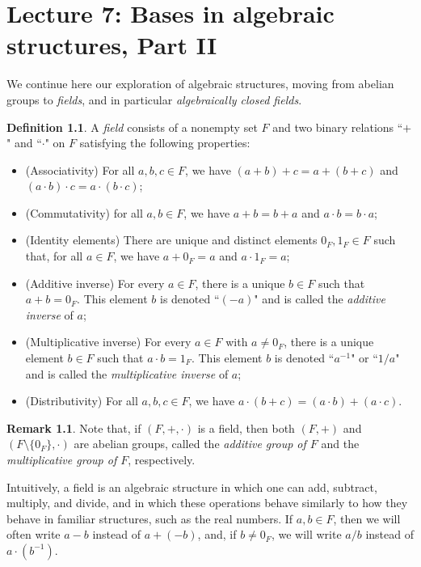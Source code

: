 \documentclass[a4paper]{memoir}
\theoremstyle{definition}
\newtheorem{definition}[theorem]{Definition}
\newtheorem{remark}[theorem]{Remark}
\begin{document}
\chapter{Lecture 7: Bases in algebraic structures, Part II}

We continue here our exploration of algebraic structures, moving from abelian groups to 
\emph{fields}, and in particular \emph{algebraically closed fields}.

\begin{definition}
  A \emph{field} consists of a nonempty set $F$ and two binary relations ``$+$" and 
  ``$\cdot$" on $F$ satisfying the following properties:
  \begin{itemize}
    \item (Associativity) For all $a,b,c \in F$, we have $(a + b) + c = a + (b + c)$ 
    and $(a \cdot b) \cdot c = a \cdot (b \cdot c)$;
    \item (Commutativity) for all $a,b \in F$, we have $a + b = b + a$ and $a \cdot b = 
    b \cdot a$;
    \item (Identity elements) There are unique and distinct elements $0_F, 1_F \in F$ such that, for all 
    $a \in F$, we have $a + 0_F = a$ and $a \cdot 1_F = a$;
    \item (Additive inverse) For every $a \in F$, there is a unique $b \in F$ such that 
    $a + b = 0_F$. This element $b$ is denoted ``$(-a)$" and is called the 
    \emph{additive inverse} of $a$;
    \item (Multiplicative inverse) For every $a \in F$ with $a \neq 0_F$, there is a 
    unique element $b \in F$ such that $a \cdot b = 1_F$. This element $b$ is denoted 
    ``$a^{-1}$" or ``$1/a$" and is called the \emph{multiplicative inverse} of $a$;
    \item (Distributivity) For all $a,b,c \in F$, we have $a \cdot (b + c) = (a \cdot b) 
    + (a \cdot c)$.
  \end{itemize}
\end{definition}

\begin{remark}
  Note that, if $(F, +, \cdot)$ is a field, then both $(F, +)$ and \\ $(F \setminus \{0_F\}, 
  \cdot)$ are abelian groups, called the \emph{additive group of $F$} and the \emph{multiplicative 
  group of $F$}, respectively.
\end{remark}

Intuitively, a field is an algebraic structure in which one can add, subtract, multiply, 
and divide, and in which these operations behave similarly to how they behave in familiar 
structures, such as the real numbers. If $a,b \in F$, then we will often write 
$a-b$ instead of $a + (-b)$, and, if $b \neq 0_F$, we will write $a/b$ instead of 
$a \cdot (b^{-1})$.
\end{document}
